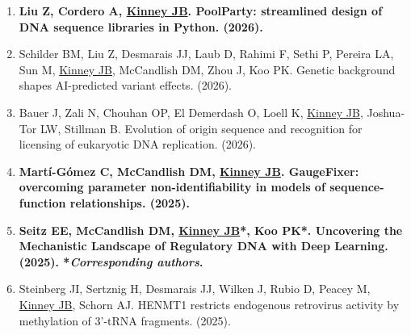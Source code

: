 \documentclass[10pt,hidelinks]{article}
\begin{document}
\begin{enumerate}

\item \textbf{Liu Z, Cordero A, \underline{Kinney JB}. PoolParty: streamlined design of DNA sequence libraries in Python.  (2026).}

\item Schilder BM, Liu Z, Desmarais JJ, Laub D, Rahimi F, Sethi P, Pereira LA, Sun M, \underline{Kinney JB}, McCandlish DM, Zhou J, Koo PK. Genetic background shapes AI-predicted variant effects.  (2026).

\item Bauer J, Zali N, Chouhan OP, El Demerdash O, Loell K, \underline{Kinney JB}, Joshua-Tor LW, Stillman B. Evolution of origin sequence and recognition for licensing of eukaryotic DNA replication.  (2026).

\item \textbf{Mart\'{i}-G\'{o}mez C, McCandlish DM, \underline{Kinney JB}. GaugeFixer: overcoming parameter non-identifiability in models of sequence-function relationships.  (2025).}

\item \textbf{Seitz EE, McCandlish DM, \underline{Kinney JB}*, Koo PK*. Uncovering the Mechanistic Landscape of Regulatory DNA with Deep Learning.  (2025). *\textit{Corresponding authors}.}

\item Steinberg JI, Sertznig H, Desmarais JJ, Wilken J, Rubio D, Peacey M, \underline{Kinney JB}, Schorn AJ. HENMT1 restricts endogenous retrovirus activity by methylation of 3'-tRNA fragments.  (2025).%

\end{enumerate}
\,\\
\end{document}
